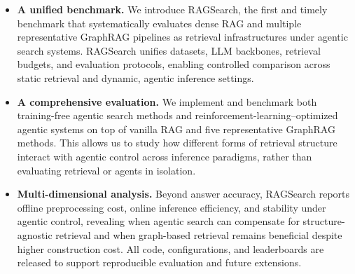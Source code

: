 \begin{itemize}[noitemsep,leftmargin=*]
\item \textbf{A unified benchmark.} We introduce RAGSearch, the first and timely benchmark that systematically evaluates dense RAG and multiple representative GraphRAG pipelines as retrieval infrastructures under agentic search systems. RAGSearch unifies datasets, LLM backbones, retrieval budgets, and evaluation protocols, enabling controlled comparison across static retrieval and dynamic, agentic inference settings.
\item \textbf{A comprehensive evaluation.} We implement and benchmark both training-free agentic search methods and reinforcement-learning–optimized agentic systems on top of vanilla RAG and five representative GraphRAG methods. This allows us to study how different forms of retrieval structure interact with agentic control across inference paradigms, rather than evaluating retrieval or agents in isolation. %
\item \textbf{Multi-dimensional analysis.} Beyond answer accuracy, RAGSearch reports offline preprocessing cost, online inference efficiency, and stability under agentic control, revealing when agentic search can compensate for structure-agnostic retrieval and when graph-based retrieval remains beneficial despite higher construction cost. All code, configurations, and leaderboards are released to support reproducible evaluation and future extensions.
\end{itemize}